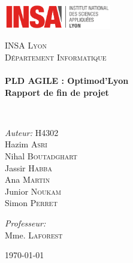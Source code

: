 \begin{titlepage}
\begin{center}

\includegraphics[width=0.35\textwidth]{./logo}~\\[2cm]

\vspace{3cm}

\textsc{\LARGE INSA Lyon}\\[0.5cm]
\textsc{\Large Département Informatique}\\[0.5cm]

\HRule \\[0.4cm]

{\huge \bfseries PLD AGILE : Optimod'Lyon\\
 Rapport de fin de projet\\[0.4cm] }

\HRule \\[1.5cm]

\begin{minipage}{0.4\textwidth}
\begin{flushleft} \large
\emph{Auteur:} H4302\\
Hazim \textsc{Asri}\\
Nihal \textsc{Boutadghart}\\
Jassir \textsc{Habba}\\
Ana \textsc{Martin}\\
Junior \textsc{Noukam}\\
Simon \textsc{Perret}\\
\end{flushleft}
\end{minipage}
\begin{minipage}{0.4\textwidth}
\begin{flushright} \large
\emph{Professeur:} \\
Mme. \textsc{Laforest}\\
\end{flushright}
\end{minipage}

\vfill

{\large \today}

\end{center}
\end{titlepage}